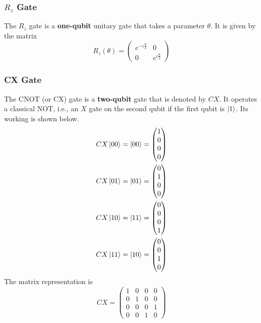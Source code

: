 \subsubsection*{$R_z$ Gate}
The $R_z$ gate is a \textbf{one-qubit} unitary gate that takes a parameter $\theta$. It is given by the matrix 
\begin{equation*}
R_z(\theta)=
\begin{pmatrix}
e^{-\iota\frac{\theta}{2}}&0\\
0&e^{\iota\frac{\theta}{2}}
\end{pmatrix}
\end{equation*}

\subsubsection*{CX Gate}
The CNOT (or CX) gate is a \textbf{two-qubit} gate that is denoted by $CX$. It operates a classical NOT, i.e., an $X$ gate on the second qubit if the first qubit is $\left\vert 1\right\rangle$. Its working is shown below.
\begin{equation*}
\begin{split}
CX\left\vert 00\right\rangle&=\left\vert 00\right\rangle=
\begin{pmatrix}
1\\
0\\
0\\
0
\end{pmatrix}\\
CX\left\vert 01\right\rangle&=\left\vert 01\right\rangle=
\begin{pmatrix}
0\\
1\\
0\\
0
\end{pmatrix}\\
CX\left\vert 10\right\rangle&=\left\vert 11\right\rangle=
\begin{pmatrix}
0\\
0\\
0\\
1
\end{pmatrix}\\
CX\left\vert 11\right\rangle&=\left\vert 10\right\rangle=
\begin{pmatrix}
0\\
0\\
1\\
0
\end{pmatrix}\\
\end{split}
\end{equation*}
The matrix representation is
\begin{equation*}
CX=
\begin{pmatrix}
1&0&0&0\\
0&1&0&0\\
0&0&0&1\\
0&0&1&0
\end{pmatrix}
\end{equation*}
